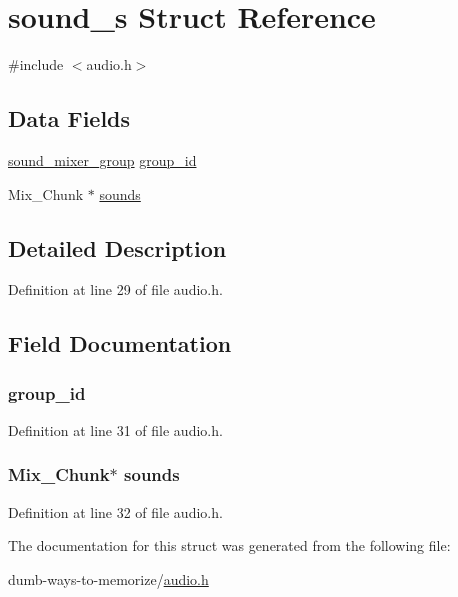 \hypertarget{structsound__s}{}\section{sound\+\_\+s Struct Reference}
\label{structsound__s}


{\ttfamily \#include $<$audio.\+h$>$}

\subsection*{Data Fields}
\begin{DoxyCompactItemize}
\item 
\hyperlink{audio_8h_aefd8a54164d8e94ab23d6e2325d31d62}{sound\+\_\+mixer\+\_\+group} \hyperlink{structsound__s_a48f8c3bfb8f583f6b01b6d98a4c1b76e}{group\+\_\+id}
\item 
Mix\+\_\+\+Chunk $\ast$ \hyperlink{structsound__s_a6d93e5d3ad0129fe52153ecacc4f162a}{sounds}
\end{DoxyCompactItemize}


\subsection{Detailed Description}


Definition at line 29 of file audio.\+h.



\subsection{Field Documentation}
\subsubsection[{\texorpdfstring{group\+\_\+id}{group_id}}]{ group\+\_\+id}\hypertarget{structsound__s_a48f8c3bfb8f583f6b01b6d98a4c1b76e}{}\label{structsound__s_a48f8c3bfb8f583f6b01b6d98a4c1b76e}


Definition at line 31 of file audio.\+h.

\subsubsection[{\texorpdfstring{sounds}{sounds}}]{\setlength{\rightskip}{0pt plus 5cm}Mix\+\_\+\+Chunk$\ast$ sounds}\hypertarget{structsound__s_a6d93e5d3ad0129fe52153ecacc4f162a}{}\label{structsound__s_a6d93e5d3ad0129fe52153ecacc4f162a}


Definition at line 32 of file audio.\+h.



The documentation for this struct was generated from the following file\+:\begin{DoxyCompactItemize}
\item 
dumb-\/ways-\/to-\/memorize/\hyperlink{audio_8h}{audio.\+h}\end{DoxyCompactItemize}
